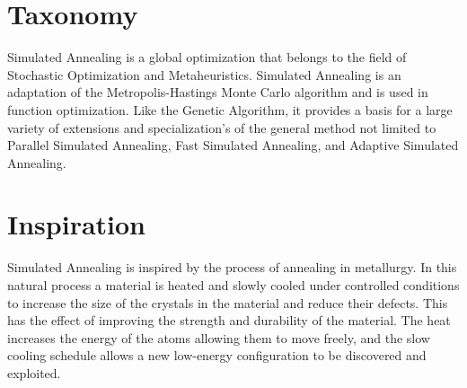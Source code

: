 \documentclass[a4paper, 11pt]{article}
\begin{document}
\section{Taxonomy}
\label{sec:taxonomy}
Simulated Annealing is a global optimization that belongs to the field of Stochastic Optimization and Metaheuristics.
Simulated Annealing is an adaptation of the Metropolis-Hastings Monte Carlo algorithm and is used in function optimization. Like the Genetic Algorithm, it provides a basis for a large variety of extensions and specialization's of the general method not limited to Parallel Simulated Annealing, Fast Simulated Annealing, and Adaptive Simulated Annealing.

\section{Inspiration}
\label{sec:inspiration}
Simulated Annealing is inspired by the process of annealing in metallurgy. In this natural process a material is heated and slowly cooled under controlled conditions to increase the size of the crystals in the material and reduce their defects. This has the effect of improving the strength and durability of the material. The heat increases the energy of the atoms allowing them to move freely, and the slow cooling schedule allows a new low-energy configuration to be discovered and exploited.
\end{document}
